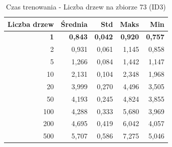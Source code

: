 \begin{table}[htbp]
\centering
\small
\setlength{\tabcolsep}{6pt}
\renewcommand{\arraystretch}{1.2}
\caption{Czas trenowania - Liczba drzew na zbiorze 73 (ID3)}
\label{tab:ID3_tree_count_73_time}
\begin{tabular}{r|r|r|r|r}
\toprule
Liczba drzew & Średnia & Std & Maks & Min \\
\hline
\textbf{1} & \textbf{0,843} & \textbf{0,042} & \textbf{0,920} & \textbf{0,757} \\
2 & 0,931 & 0,061 & 1,145 & 0,858 \\
5 & 1,266 & 0,084 & 1,442 & 1,147 \\
10 & 2,131 & 0,104 & 2,348 & 1,968 \\
20 & 3,999 & 0,270 & 4,496 & 3,505 \\
50 & 4,193 & 0,245 & 4,824 & 3,855 \\
100 & 4,288 & 0,333 & 5,680 & 3,969 \\
200 & 4,695 & 0,419 & 6,042 & 4,057 \\
500 & 5,707 & 0,586 & 7,275 & 5,046 \\
\bottomrule
\end{tabular}
\end{table}